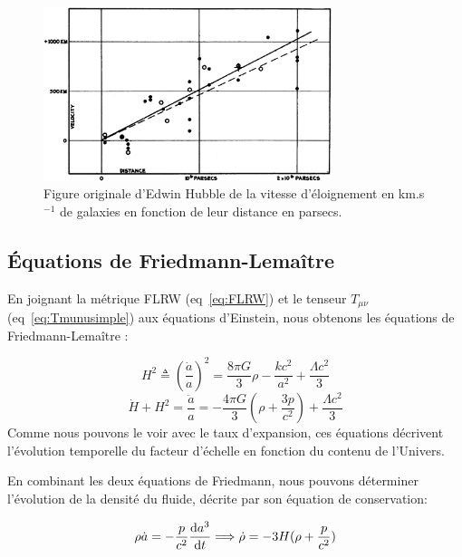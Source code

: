 \documentclass[../main/main.tex]{subfiles}
\begin{document}
\begin{figure}[ht]
  \centering
  \includegraphics[width=0.75\textwidth]{../figures/01_cosmology/Hubble.jpg}
  \caption[Figure originale d'Edwin Hubble de la vitesse d'éloignement
  de galaxies en fonction de leur distance.]{Figure originale d'Edwin
    Hubble \citep{Hubble1929} de la vitesse d'éloignement en km.s$^{-1}$
  de galaxies en fonction de leur distance en parsecs.}
\label{fig:hubble}
\end{figure}


\subsection{\'Equations de Friedmann-Lemaître}

En joignant la métrique FLRW (eq~\ref{eq:FLRW}) et le tenseur
$T_{\mu\nu}$ (eq~\ref{eq:Tmunusimple}) aux équations d'Einstein, nous
obtenons les équations de Friedmann-Lemaître \citep{Friedmann1922}:

\begin{equation}
  \label{eq:Friedmann1}
  H^{2}\triangleq\left(\frac{\dot{a}}{a}\right)^{2}=\frac{8\pi
    G}{3}\rho-\frac{kc^{2}}{a^{2}}+\frac{\Lambda c^{2}}{3}
\end{equation}
\begin{equation}
  \label{eq:Friedmann2}
  \dot{H}+H^{2}=\frac{\ddot{a}}{a}=-\frac{4\pi
    G}{3}(\rho+\frac{3p}{c^{2}})+\frac{\Lambda c^{2}}{3}
\end{equation}
Comme nous pouvons le voir avec le taux d'expansion, ces équations
décrivent l'évolution temporelle du facteur d'échelle en fonction du
contenu de l'Univers.

En combinant les deux équations de Friedmann, nous pouvons déterminer
l'évolution de la densité du fluide, décrite par son équation de
conservation:

\begin{equation}
  \label{eq:conservationdensity}
  \rho \dot{a} = -\frac{p}{c^{2}}\frac{\mathrm{d} a^{3}}{\mathrm{d} t} \Longrightarrow
  \dot{\rho}=-3H(\rho+\frac{p}{c^{2}})
\end{equation}
\end{document}
